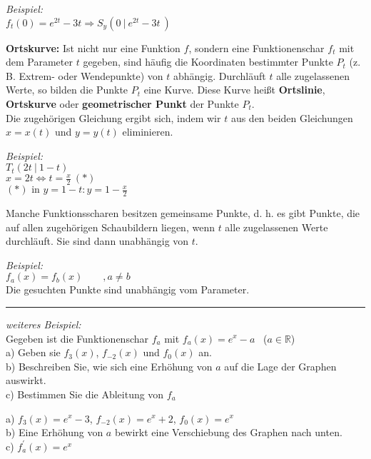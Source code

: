 \textit{Beispiel:}\\
$f_t(0) = e^{2t} -3t \Rightarrow S_y\left(0 \ | \ e^{2t} -3t \ \right)$
\begin{definition}
    \textbf{Ortskurve:} Ist nicht nur eine Funktion $f$, sondern eine Funktionenschar $f_t$ mit dem Parameter $t$ gegeben, sind häufig die Koordinaten bestimmter Punkte $P_t$ (z. B. Extrem- oder Wendepunkte) von $t$ abhängig. Durchläuft $t$ alle zugelassenen Werte, so bilden die Punkte $P_t$ eine Kurve. Diese Kurve heißt \textbf{Ortslinie}, \textbf{Ortskurve} oder \textbf{geometrischer Punkt} der Punkte $P_t$. \\
    Die zugehörigen Gleichung ergibt sich, indem wir $t$ aus den beiden Gleichungen $x = x(t)$ und $y = y(t)$ eliminieren.
\end{definition}
\textit{Beispiel:} \\
$T_t(2t \ | \ 1-t )$ \\
$x = 2t \Longleftrightarrow t = \frac{x}{2} \ (*)$\\
$(*) \text{ in } y = 1 - t: y = 1 - \frac{x}{2}$

Manche Funktionsscharen besitzen gemeinsame Punkte, d. h. es gibt Punkte, die auf allen zugehörigen Schaubildern liegen, wenn $t$ alle zugelassenen Werte durchläuft. Sie sind dann unabhängig von $t$. 

\textit{Beispiel:}\\
$f_a(x) = f_b(x) \qquad , a \neq b$\\
Die gesuchten Punkte sind unabhängig vom Parameter.

\noindent\rule{\textwidth}{1pt}

\textit{weiteres Beispiel:} \\
Gegeben ist die Funktionenschar $f_a$ mit $f_a(x) = e^x - a$ \ ($a \in \mathbb{R}$)\\
a) Geben sie $f_3(x)$, $f_{-2}(x)$ und $f_0(x)$ an.\\
b) Beschreiben Sie, wie sich eine Erhöhung von $a$ auf die Lage der Graphen auswirkt.\\
c) Bestimmen Sie die Ableitung von $f_a$

a) $f_3(x) = e^x -3$, $f_{-2}(x) = e^x +2$, $f_0(x) = e^x$ \\
b) Eine Erhöhung von $a$ bewirkt eine Verschiebung des Graphen nach unten. \\
c) $f^\prime_a(x) = e^x$
\ \\
\ \\
\ \\
\ \\
\ \\
\ \\
\ \\
\ \\
